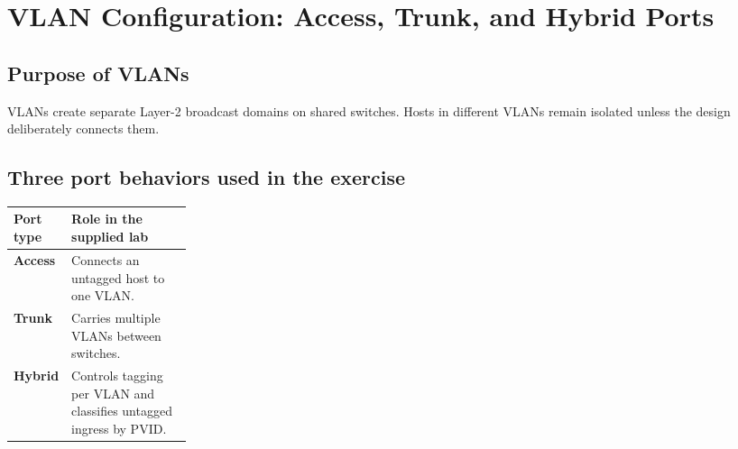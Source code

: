\chapter{VLAN Configuration: Access, Trunk, and Hybrid Ports}\label{ch:vlan}

\section{Purpose of VLANs}
VLANs create separate Layer-2 broadcast domains on shared switches. Hosts in different VLANs remain isolated unless the design deliberately connects them.


\section{Three port behaviors used in the exercise}
\begin{tabularx}{\linewidth}{>{\bfseries}p{0.23\linewidth}X}
\toprule
Port type & Role in the supplied lab\\\midrule
Access & Connects an untagged host to one VLAN.\\
Trunk & Carries multiple VLANs between switches.\\
Hybrid & Controls tagging per VLAN and classifies untagged ingress by PVID.\\\bottomrule
\end{tabularx}

